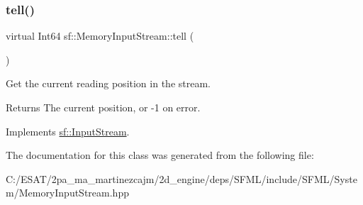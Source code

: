 \subsubsection{\texorpdfstring{tell()}{tell()}}
{\footnotesize\ttfamily virtual Int64 sf\+::\+Memory\+Input\+Stream\+::tell (\begin{DoxyParamCaption}{ }\end{DoxyParamCaption})\hspace{0.3cm}{\ttfamily [virtual]}}



Get the current reading position in the stream. 

\begin{DoxyReturn}{Returns}
The current position, or -\/1 on error. 
\end{DoxyReturn}


Implements \hyperlink{classsf_1_1_input_stream_a599515b9ccdbddb6fef5a98424fd559c}{sf\+::\+Input\+Stream}.



The documentation for this class was generated from the following file\+:\begin{DoxyCompactItemize}
\item 
C\+:/\+E\+S\+A\+T/2pa\+\_\+ma\+\_\+martinezcajm/2d\+\_\+engine/deps/\+S\+F\+M\+L/include/\+S\+F\+M\+L/\+System/Memory\+Input\+Stream.\+hpp\end{DoxyCompactItemize}

